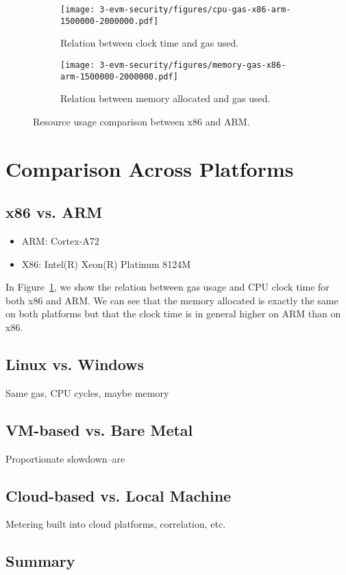 \begin{figure}[tb]
  \begin{subfigure}{\columnwidth}
    \centering\texttt{[image: 3-evm-security/figures/cpu-gas-x86-arm-1500000-2000000.pdf]}
    \caption{Relation between clock time and gas used.}
    \label{fig:x86-arm-cpu}
  \end{subfigure}

  \begin{subfigure}{\columnwidth}
    \centering\texttt{[image: 3-evm-security/figures/memory-gas-x86-arm-1500000-2000000.pdf]}
    \caption{Relation between memory allocated and gas used.}
    \label{fig:x86-arm-memory}
  \end{subfigure}

  \caption{Resource usage comparison between x86 and ARM.}
  \label{fig:x86-arm}
\end{figure}

\section{Comparison Across Platforms}
\label{sec:cloud}

\subsection{x86 vs. ARM}

\begin{itemize}
\item ARM: Cortex-A72
\item X86: Intel(R) Xeon(R) Platinum 8124M
\end{itemize}

In Figure~\ref{fig:x86-arm-cpu}, we show the relation between gas usage and CPU clock time for both x86 and ARM. We can see that the memory allocated is exactly the same on both platforms but that the clock time is in general higher on ARM than on x86.

\subsection{Linux vs. Windows}
Same gas, CPU cycles, maybe memory

\subsection{VM-based vs. Bare Metal}
Proportionate slowdown--are

\subsection{Cloud-based vs. Local Machine}
Metering built into cloud platforms, correlation, etc.

\subsection{Summary}

